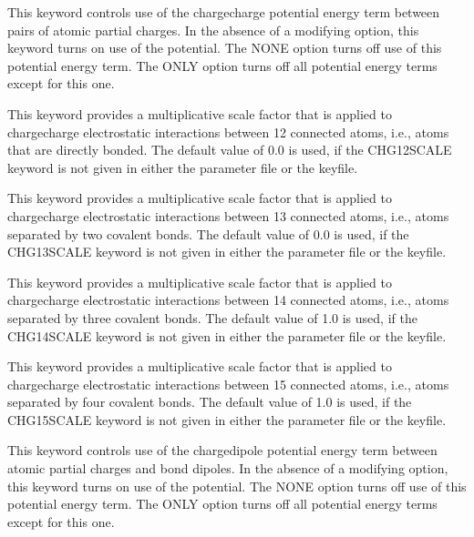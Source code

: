 \documentclass[letterpaper,11pt,english]{sphinxmanual}
\begin{document}
  This keyword controls use of the charge\sphinxhyphen{}charge potential energy term between pairs of atomic partial charges. In the absence of a modifying option, this keyword turns on use of the potential. The NONE option turns off use of this potential energy term. The ONLY option turns off all potential energy terms except for this one.



  This keyword provides a multiplicative scale factor that is applied to charge\sphinxhyphen{}charge electrostatic interactions between 1\sphinxhyphen{}2 connected atoms, i.e., atoms that are directly bonded. The default value of 0.0 is used, if the CHG\sphinxhyphen{}12\sphinxhyphen{}SCALE keyword is not given in either the parameter file or the keyfile.

  This keyword provides a multiplicative scale factor that is applied to charge\sphinxhyphen{}charge electrostatic interactions between 1\sphinxhyphen{}3 connected atoms, i.e., atoms separated by two covalent bonds. The default value of 0.0 is used, if the CHG\sphinxhyphen{}13\sphinxhyphen{}SCALE keyword is not given in either the parameter file or the keyfile.

  This keyword provides a multiplicative scale factor that is applied to charge\sphinxhyphen{}charge electrostatic interactions between 1\sphinxhyphen{}4 connected atoms, i.e., atoms separated by three covalent bonds. The default value of 1.0 is used, if the CHG\sphinxhyphen{}14\sphinxhyphen{}SCALE keyword is not given in either the parameter file or the keyfile.

  This keyword provides a multiplicative scale factor that is applied to charge\sphinxhyphen{}charge electrostatic interactions between 1\sphinxhyphen{}5 connected atoms, i.e., atoms separated by four covalent bonds. The default value of 1.0 is used, if the CHG\sphinxhyphen{}15\sphinxhyphen{}SCALE keyword is not given in either the parameter file or the keyfile.


  This keyword controls use of the charge\sphinxhyphen{}dipole potential energy term between atomic partial charges and bond dipoles. In the absence of a modifying option, this keyword turns on use of the potential. The NONE option turns off use of this potential energy term. The ONLY option turns off all potential energy terms except for this one.
\end{document}
